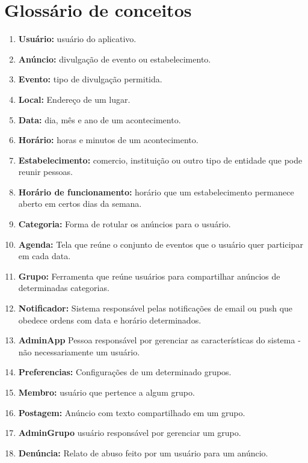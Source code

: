 \documentclass{article}
\begin{document}
\section{Glossário de conceitos}
    
\begin{enumerate}[label=\textbf{\arabic*}]
\item \textbf{Usuário:} usuário do aplicativo.
\item \textbf{Anúncio:} divulgação de evento ou estabelecimento.
\item \textbf{Evento:} tipo de divulgação permitida.
\item \textbf{Local:} Endereço de um lugar.
\item \textbf{Data:} dia, mês e ano de um acontecimento.
\item \textbf{Horário:} horas e minutos de um acontecimento.
\item \textbf{Estabelecimento:} comercio, instituição ou outro tipo de entidade que pode reunir pessoas.
\item \textbf{Horário de funcionamento:} horário que um estabelecimento permanece aberto em certos dias da semana.
\item \textbf{Categoria:} Forma de rotular os anúncios para o usuário.
\item \textbf{Agenda:} Tela que reúne o conjunto de eventos que o usuário quer participar em cada data.
\item \textbf{Grupo:} Ferramenta que reúne usuários para compartilhar anúncios de determinadas categorias.
\item \textbf{Notificador:} Sistema responsável pelas notificações de email ou push que obedece ordens com data e horário determinados.
\item \textbf{AdminApp} Pessoa responsável por gerenciar as características do sistema - não necessariamente um usuário.
\item \textbf{Preferencias:} Configurações de um determinado grupos.
\item \textbf{Membro:} usuário que pertence a algum grupo.
\item \textbf{Postagem:} Anúncio com texto compartilhado em um grupo.
\item \textbf{AdminGrupo} usuário responsável por gerenciar um grupo.
\item \textbf{Denúncia:} Relato de abuso feito por um usuário para um anúncio.
\end{enumerate}
\end{document}
